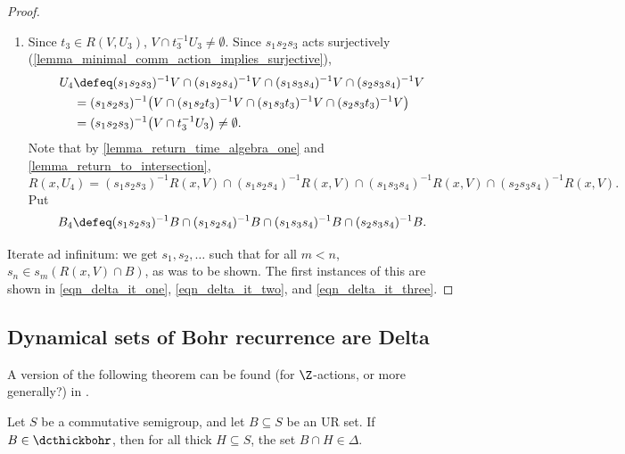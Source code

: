 \begin{proof}
\begin{enumerate}
\begin{enumerate}
            \item Since $t_3 \in R(V,U_3)$, $V \cap t_3^{-1} U_3 \neq \emptyset$.  Since $s_1s_2s_3$ acts surjectively (\cref{lemma_minimal_comm_action_implies_surjective}),
            \begin{align*}
                U_4 &\defeq (s_1s_2s_3)^{-1} V \cap (s_1 s_2 s_4)^{-1} V \cap (s_1 s_3 s_4)^{-1} V \cap (s_2s_3s_4)^{-1} V \\
                &= (s_1s_2s_3)^{-1} \big( V \cap (s_1 s_2t_3)^{-1} V \cap (s_1 s_3 t_3)^{-1} V \cap (s_2s_3 t_3)^{-1}V \big)\\
                &= (s_1s_2s_3)^{-1} \big( V \cap t_3^{-1} U_3\big) \neq \emptyset.
            \end{align*}
            Note that by \cref{lemma_return_time_algebra_one} and \cref{lemma_return_to_intersection},
            \[R(x,U_4) = (s_1s_2s_3)^{-1} R(x,V) \cap (s_1s_2s_4)^{-1} R(x,V) \cap (s_1s_3s_4)^{-1}R(x,V) \cap (s_2s_3s_4)^{-1}R(x,V).\]
            Put
            \[B_4 \defeq (s_1s_2s_3)^{-1} B \cap (s_1s_2s_4)^{-1} B \cap (s_1s_3s_4)^{-1} B \cap (s_2s_3s_4)^{-1} B.\]
        \end{enumerate}
    \end{enumerate}
    
    Iterate ad infinitum: we get $s_1, s_2, \dots$ such that for all $m < n$, $s_n \in s_m (R(x,V) \cap B)$, as was to be shown.  The first instances of this are shown in \eqref{eqn_delta_it_one}, \eqref{eqn_delta_it_two}, and \eqref{eqn_delta_it_three}.
\end{proof}

\subsection{Dynamical sets of Bohr recurrence are Delta}

A version of the following theorem can be found (for $\Z$-actions, or more generally?) in \cite{huang_shao_ye_2016}.

\begin{theorem}
\label{thm_dcthickbohr_is_delta_for_rxu}
\leanok{}
    Let $S$ be a commutative semigroup, and let $B \subseteq S$ be an UR set.  If $B \in \dcthickbohr$, then for all thick $H \subseteq S$, the set $B \cap H \in \Delta$.
\end{theorem}

